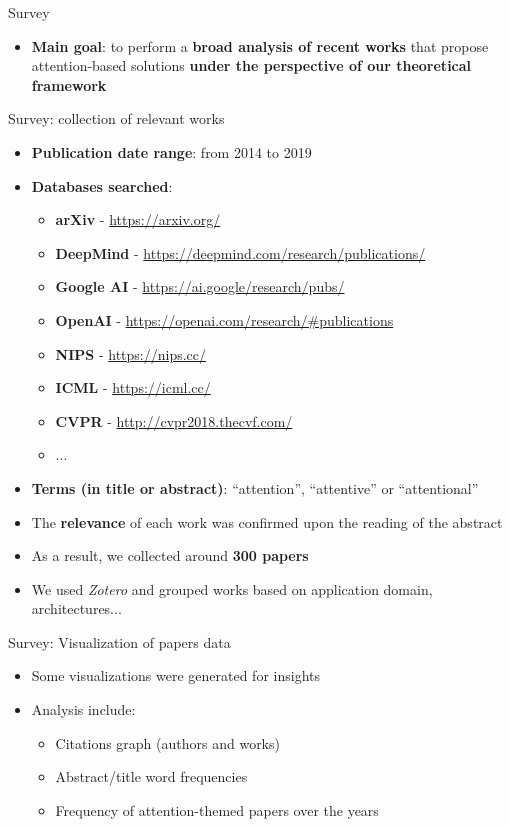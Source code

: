 \documentclass[10pt]{beamer}
\begin{document}
\begin{frame}{Survey}
    \begin{itemize}
        \item \textbf{Main goal}: to perform a \textbf{broad analysis of recent works} that propose attention-based solutions \textbf{under the perspective of our theoretical framework}
    \end{itemize}
\end{frame}

\begin{frame}{Survey: collection of relevant works}
\begin{itemize}
    \item \textbf{Publication date range}: from 2014 to 2019
    \item \textbf{Databases searched}:
    \begin{itemize}
        \item \textbf{arXiv} - \url{https://arxiv.org/}
        \item \textbf{DeepMind} - \url{https://deepmind.com/research/publications/}
        \item \textbf{Google AI} - \url{https://ai.google/research/pubs/}
        \item \textbf{OpenAI} - \url{https://openai.com/research/#publications}
        \item \textbf{NIPS} - \url{https://nips.cc/}
        \item \textbf{ICML} - \url{https://icml.cc/}
        \item \textbf{CVPR} - \url{http://cvpr2018.thecvf.com/}
        \item ...
    \end{itemize}
    \item \textbf{Terms (in title or abstract)}: ``attention'',
        ``attentive'' or ``attentional''
    \item The \textbf{relevance} of each work was confirmed upon the reading of the abstract
    \item As a result, we collected around \textbf{300 papers}
    \item We used \emph{Zotero} and grouped works based on application domain, architectures...
\end{itemize}
\end{frame}

\begin{frame}{Survey: Visualization of papers data}
    \begin{itemize}
        \item Some visualizations were generated for insights
        \item Analysis include:
        \begin{itemize}
            \item Citations graph (authors and works)
            \item Abstract/title word frequencies
            \item Frequency of attention-themed papers over the years
        \end{itemize}
    \end{itemize}
\end{frame}
\end{document}
